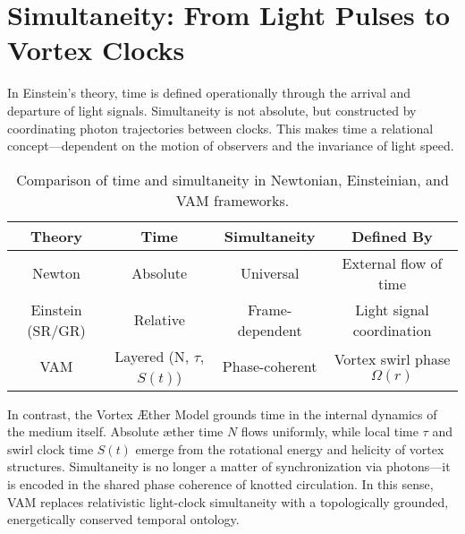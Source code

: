 \documentclass[preprint,notitlepage]{revtex4-2}
\begin{document}
    \vspace{1em}
    \noindent

\section{Simultaneity: From Light Pulses to Vortex Clocks}


    In Einstein’s theory, time is defined operationally through the arrival and departure of light signals. Simultaneity is not absolute, but constructed by coordinating photon trajectories between clocks. This makes time a relational concept—dependent on the motion of observers and the invariance of light speed.

    \begin{table}[h!]
        \centering
        \begin{tabular}{|c|c|c|c|}
            \hline
            \textbf{Theory} & \textbf{Time} & \textbf{Simultaneity} & \textbf{Defined By} \\
            \hline
            Newton & Absolute & Universal & External flow of time \\
            Einstein (SR/GR) & Relative & Frame-dependent & Light signal coordination \\
            VAM & Layered (N, $\tau$, $S(t)$) & Phase-coherent & Vortex swirl phase $\Omega(r)$ \\
            \hline
        \end{tabular}
        \caption{Comparison of time and simultaneity in Newtonian, Einsteinian, and VAM frameworks.}
    \end{table}

    In contrast, the Vortex Æther Model grounds time in the internal dynamics of the medium itself. Absolute æther time \( N \) flows uniformly, while local time \( \tau \) and swirl clock time \( S(t) \) emerge from the rotational energy and helicity of vortex structures. Simultaneity is no longer a matter of synchronization via photons—it is encoded in the shared phase coherence of knotted circulation. In this sense, VAM replaces relativistic light-clock simultaneity with a topologically grounded, energetically conserved temporal ontology.
\end{document}
